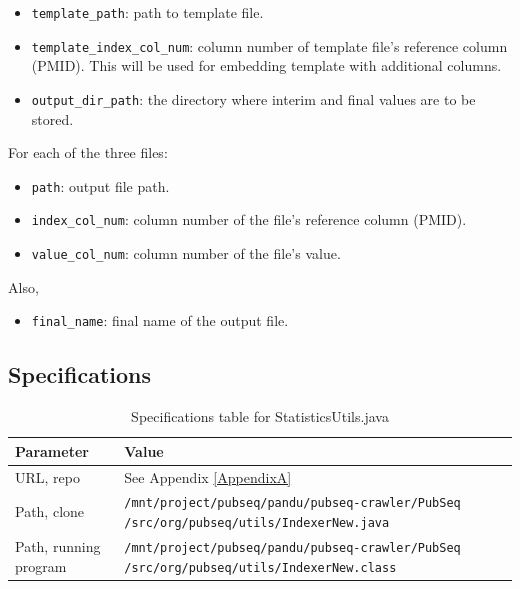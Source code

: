 \begin{itemize}
\item \texttt{template\_path}: path to template file.
\item \texttt{template\_index\_col\_num}: column number of template file's reference column (PMID). This will be used for embedding template with additional columns.
\item \texttt{output\_dir\_path}: the directory where interim and final values are to be stored.
\end{itemize}

For each of the three files:

\begin{itemize}
\item \texttt{path}: output file path.
\item \texttt{index\_col\_num}: column number of the file's reference column (PMID).
\item \texttt{value\_col\_num}: column number of the file's value.
\end{itemize}

Also,

\begin{itemize}
\item \texttt{final\_name}: final name of the output file.
\end{itemize}

\subsection{Specifications}

\begin{table}[htbp]
\caption{Specifications table for StatisticsUtils.java}
\centering
\begin{tabularx}{\textwidth}{ | l | X | }
  \hline
  Parameter & Value \\
  \hline
  URL, repo & See Appendix \ref{AppendixA} \\
  Path, clone & \texttt{/mnt/project/pubseq/pandu/pubseq-crawler/PubSeq /src/org/pubseq/utils/IndexerNew.java} \\
  Path, running program & \texttt{/mnt/project/pubseq/pandu/pubseq-crawler/PubSeq /src/org/pubseq/utils/IndexerNew.class}\\
  \hline
\end{tabularx}
\end{table}


